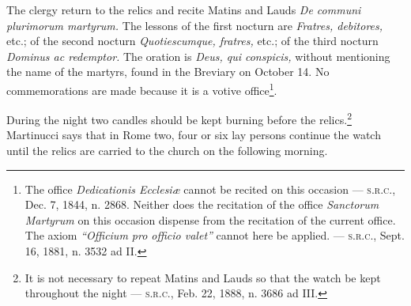 \documentclass[letterpaper]{report}
\newcommand\src{\textsc{s.r.c.}}
\begin{document}
{\rubric The clergy return to the relics and recite Matins and Lauds \textit{De
communi plurimorum martyrum.} The lessons of the first nocturn are
\textit{Fratres, debitores,} etc.; of the second nocturn \textit{Quotiescumque,
fratres,} etc.; of the third nocturn \textit{Dominus ac redemptor.} The oration
is \textit{Deus, qui conspicis,} without mentioning the name of the martyrs,
found in the Breviary on October 14. No commemorations are made because it is a
votive office\footnote{The office \textit{Dedicationis Ecclesi\ae} cannot be
recited on this occasion --- \src, Dec. 7, 1844, n. 2868. Neither does the
recitation of the office \textit{Sanctorum Martyrum} on this occasion dispense
from the recitation of the current office. The axiom \textit{``Officium pro
officio valet''} cannot here be applied. --- \src, Sept. 16, 1881, n. 3532 ad
II.}.

\rubric During the night two candles should be kept burning before the
relics.\footnote{It is not necessary to repeat Matins and Lauds so that the
watch be kept throughout the night --- \src, Feb. 22, 1888, n. 3686 ad III.}
Martinucci says that in Rome two, four or six lay persons continue the watch
until the relics are carried to the church on the following morning.

}
\end{document}

